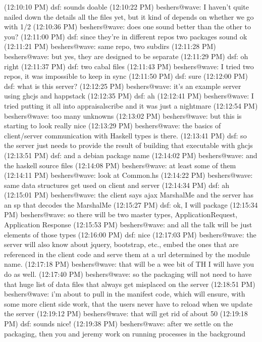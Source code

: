 (12:10:10 PM) dsf: sounds doable
(12:10:22 PM) beshers@wave: I haven't quite nailed down the details all the files yet, but it kind of depends on whether we go with 1/2
(12:10:36 PM) beshers@wave: does one sound better than the other to you?
(12:11:00 PM) dsf: since they're in different repos two packages sound ok
(12:11:21 PM) beshers@wave: same repo, two subdirs
(12:11:28 PM) beshers@wave: but yes, they are designed to be separate
(12:11:29 PM) dsf: oh right
(12:11:37 PM) dsf: two cabal files
(12:11:43 PM) beshers@wave: I tried two repos, it was impossible to keep in sync
(12:11:50 PM) dsf: sure
(12:12:00 PM) dsf: what is this server?
(12:12:25 PM) beshers@wave: it's an example server using ghcjs and happstack
(12:12:35 PM) dsf: ah
(12:12:41 PM) beshers@wave: I tried putting it all into appraisalscribe and it was just a nightmare
(12:12:54 PM) beshers@wave: too many unknowns
(12:13:02 PM) beshers@wave: but this is starting to look really nice
(12:13:29 PM) beshers@wave: the basics of client/server communication with Haskell types is there.
(12:13:41 PM) dsf: so the server just needs to provide the result of building that executable with ghcjs
(12:13:51 PM) dsf: and a debian package name
(12:14:02 PM) beshers@wave: and the haskell source files
(12:14:08 PM) beshers@wave: at least some of them
(12:14:11 PM) beshers@wave: look at Common.hs
(12:14:22 PM) beshers@wave: same data structures get used on client and server
(12:14:34 PM) dsf: ah
(12:15:01 PM) beshers@wave: the client says     ajax  MarshalMe and the server has an sp that decodes the MarshalMe
(12:15:27 PM) dsf: ok, I will package
(12:15:34 PM) beshers@wave: so there will be two master types,  ApplicationRequest, Application Response
(12:15:53 PM) beshers@wave: and all the talk will be just elements of those types
(12:16:00 PM) dsf: nice
(12:17:03 PM) beshers@wave: the server will also know about jquery, bootstrap, etc., embed the ones that are referenced in the client code and serve them at a url determined by the module name.
(12:17:18 PM) beshers@wave: that will be a wee bit of TH I will have you do as well.
(12:17:40 PM) beshers@wave: so the packaging will not need to have that huge list of data files that always get misplaced on the server
(12:18:51 PM) beshers@wave: i'm about to pull in the manifest code, which will ensure, with some more client side work, that the users never have to reload when we update the server
(12:19:12 PM) beshers@wave: that will get rid of about 50%
(12:19:18 PM) dsf: sounds nice!
(12:19:38 PM) beshers@wave: after we settle on the packaging, then you and jeremy work on running processes in the background
